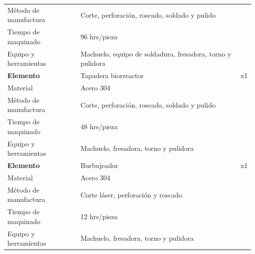 \begin{longtable}{@{} p{4.2cm} p{8.8cm} r @{}}
Método de manufactura & Corte, perforación, roscado, soldado y pulido                      &    \\
Tiempo de maquinado   & 96 hrs/pieza                                                       &    \\
Equipo y herramientas & Machuelo, equipo de soldadura, fresadora, torno y pulidora         &    \\
\midrule
\textbf{Elemento}     & Tapadera biorreactor                                               & x1 \\
Material              & Acero 304                                                          &    \\
Método de manufactura & Corte, perforación, roscado, soldado y pulido                      &    \\
Tiempo de maquinado   & 48 hrs/pieza                                                       &    \\
Equipo y herramientas & Machuelo, fresadora, torno y pulidora                              &    \\
\midrule
\textbf{Elemento}     & Burbujeador                                                        & x1 \\
Material              & Acero 304                                                          &    \\
Método de manufactura & Corte láser, perforación y roscado                                 &    \\
Tiempo de maquinado   & 12 hrs/pieza                                                       &    \\
Equipo y herramientas & Machuelo, fresadora, torno y pulidora                              &    \\
\end{longtable}

